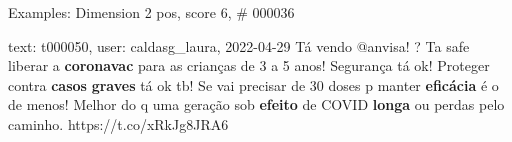 \begin{frame}{Examples: Dimension 2 pos, score 6, \# 000036}
\footnotesize
\begin{exampleblock}{text: t000050, user: caldasg\_laura, 2022-04-29}
Tá vendo @anvisa! ? Ta safe liberar a \textbf{coronavac} para as crianças de 3 
a 5 anos! Segurança tá ok! Proteger contra \textbf{casos} \textbf{graves} tá ok 
tb! Se vai precisar de 30 doses p manter \textbf{eficácia} é o de menos! Melhor 
do q uma geração sob \textbf{efeito} de COVID \textbf{longa} ou perdas pelo 
caminho. https://t.co/xRkJg8JRA6 
\end{exampleblock}
\end{frame}
